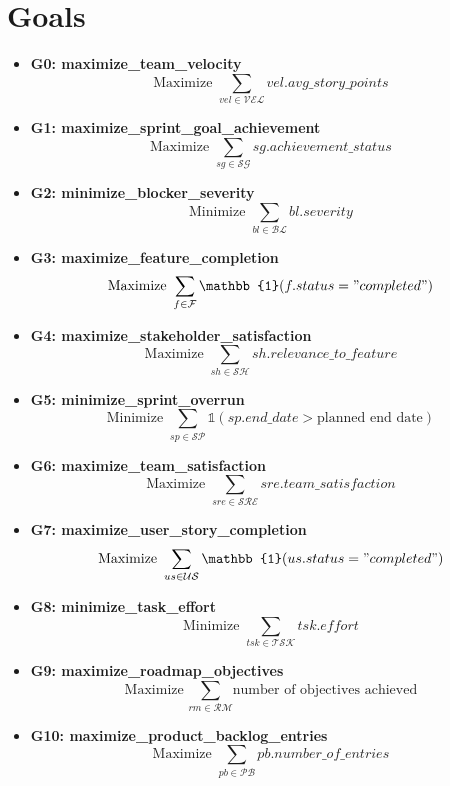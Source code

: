 \documentclass{article}
\begin{document}
\section{Goals}
\begin{itemize}
    \item \textbf{G0: maximize\_team\_velocity}
    \[
    \text{Maximize } \sum_{vel \in \mathcal{VEL}} vel.avg\_story\_points
    \]
    \item \textbf{G1: maximize\_sprint\_goal\_achievement}
    \[
    \text{Maximize } \sum_{sg \in \mathcal{SG}} sg.achievement\_status
    \]
    \item \textbf{G2: minimize\_blocker\_severity}
    \[
    \text{Minimize } \sum_{bl \in \mathcal{BL}} bl.severity
    \]
    \item \textbf{G3: maximize\_feature\_completion}
    \[
    \text{Maximize } \sum_{f \in \mathcal{F}} \mathbb{1}(f.status = "completed")
    \]
    \item \textbf{G4: maximize\_stakeholder\_satisfaction}
    \[
    \text{Maximize } \sum_{sh \in \mathcal{SH}} sh.relevance\_to\_feature
    \]
    \item \textbf{G5: minimize\_sprint\_overrun}
    \[
    \text{Minimize } \sum_{sp \in \mathcal{SP}} \mathbb{1}(sp.end\_date > \text{planned end date})
    \]
    \item \textbf{G6: maximize\_team\_satisfaction}
    \[
    \text{Maximize } \sum_{sre \in \mathcal{SRE}} sre.team\_satisfaction
    \]
    \item \textbf{G7: maximize\_user\_story\_completion}
    \[
    \text{Maximize } \sum_{us \in \mathcal{US}} \mathbb{1}(us.status = "completed")
    \]
    \item \textbf{G8: minimize\_task\_effort}
    \[
    \text{Minimize } \sum_{tsk \in \mathcal{TSK}} tsk.effort
    \]
    \item \textbf{G9: maximize\_roadmap\_objectives}
    \[
    \text{Maximize } \sum_{rm \in \mathcal{RM}} \text{number of objectives achieved}
    \]
    \item \textbf{G10: maximize\_product\_backlog\_entries}
    \[
    \text{Maximize } \sum_{pb \in \mathcal{PB}} pb.number\_of\_entries
    \]
\end{itemize}
\end{document}
